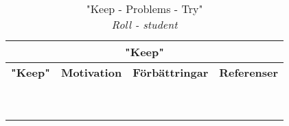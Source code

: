 \begin{table}[htbp]
\caption{"Keep - Problems - Try"\\\textit{Roll - student}}
\begin{center}
\begin{tabular}{|c|c|c|c|}
\hline
\multicolumn{4}{|c|}{\cellcolor{grey}\textbf{"Keep"}}\\
\hline \rowcolor{grey}
\textbf{"Keep"}                         & \textbf{Motivation}      & \textbf{Förbättringar} & \textbf{Referenser} \\
\hline
                                        &                          &                     & \\
                                        &                          &                     & \\
\hline
                                        &                          &                     & \\
                                        &                          &                     & \\
\hline
                                        &                          &                     & \\
\hline
                                        &                          &                     & \\
\hline
                                        &                          &                     & \\
\hline
                                        &                          &                     & \\
\hline

\multicolumn{4}{c}{}\\


\end{tabular}
\end{center}
\end{table}
